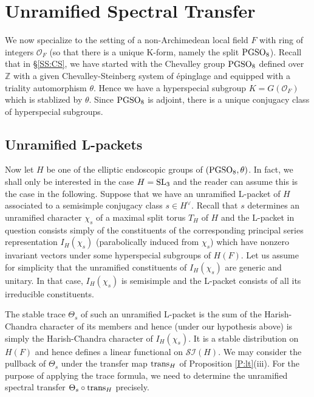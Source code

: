 \documentclass[11pt]{amsart}
\theoremstyle{plain}
\numberwithin{equation}{section}
\newcommand{\Z}{\mathbb Z}
\def\SL{{\rm SL}}
\def\PGSO{{\rm PGSO}}
\def\Z{{\mathbb Z}}
\begin{document}
\vskip 10pt


\section{\bf Unramified Spectral Transfer} \label{SS:local-unram-T}
We now specialize to the setting of a non-Archimedean local field $F$ with ring of integers $\mathcal{O}_F$ (so that there is a unique K-form, namely the split $\PGSO_8$). Recall that in \S \ref{SS:CS}, we have started  with  the Chevalley group  $\PGSO_8$ defined over $\Z$ with a given Chevalley-Steinberg system of \'epinglage and equipped with a triality automorphism $\theta$. Hence we have a hyperspecial subgroup $K = G(\mathcal{O}_F)$ which is stablized by $\theta$. 
Since $\PGSO_8$ is adjoint, there is a unique conjugacy class of hyperspecial subgroups.
\vskip 5pt

\subsection{\bf Unramified L-packets}
 Now let $H$ be one of the elliptic endoscopic groups of $(\PGSO_8, \theta)$. In fact, we shall only be interested in the case $H = \SL_3$ and the reader can assume this is the case in the following.  Suppose that we have an unramified L-packet of $H$ associated to a semisimple conjugacy class $s \in H^{\vee}$.
Recall that $s$ determines an unramified character $\chi_s$ of a maximal split torus $T_H$ of $H$ and the L-packet in question consists simply of the constituents of the corresponding principal series representation $I_H(\chi_s)$ (parabolically induced from $\chi_s$) which have nonzero invariant vectors under some hyperspecial subgroups of $H(F)$.
Let us assume for simplicity that  the unramified constituents of  $I_H(\chi_s)$ are generic and unitary. In that case,  $I_H(\chi_s)$ is semisimple and the L-packet consists of all its irreducible constituents.
\vskip 5pt

The stable trace $\Theta_s$ of such an unramified  L-packet is the sum of the Harish-Chandra character of its members and hence (under our hypothesis above) is  simply the Harish-Chandra character of $I_H(\chi_s)$.  It is a stable distribution on $H(F)$ and hence defines  a linear  functional on $\mathcal{SI}(H)$.    We may consider the pullback of $\Theta_s$ under the transfer map ${\rm trans}_H$ of Proposition \ref{P:lt}(iii). For the purpose of applying the trace formula, we need to determine the unramified spectral transfer $\Theta_s \circ {\rm trans}_H$ precisely.
\end{document}

